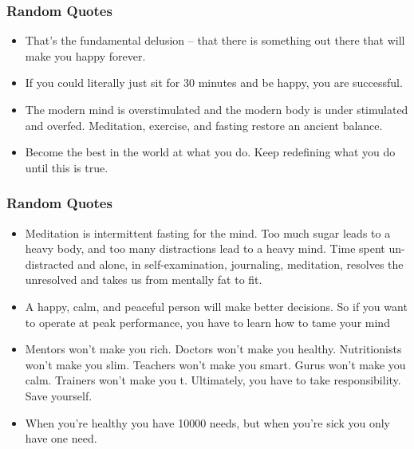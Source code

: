 \begin{frame}[fragile]\frametitle{ Random Quotes}

\begin{itemize}
\item That’s the fundamental delusion – that there is something out there
that will make you happy forever. 
\item If you could literally just sit for 30 minutes and be happy, you are
successful. 
\item The modern mind is overstimulated and the modern body is
under stimulated and overfed. Meditation, exercise, and fasting
restore an ancient balance.
\item Become the best in the world at what you do. Keep redefining what
you do until this is true.
\end{itemize}

\end{frame}

\begin{frame}[fragile]\frametitle{ Random Quotes}

\begin{itemize}
\item Meditation  is intermittent fasting for the mind. Too much sugar leads
to a heavy body, and too many distractions lead to a heavy mind.
Time spent un-distracted and alone, in self-examination, journaling,
meditation, resolves the unresolved and takes us from mentally fat to fit.

\item A happy, calm, and peaceful person will make better decisions. So if
you want to operate at peak performance, you have to learn how to
tame your mind

\item Mentors won’t make you rich. Doctors won’t make you healthy.
Nutritionists won’t make you slim. Teachers won’t make you smart. Gurus won’t make you calm. Trainers won’t make you  t. Ultimately,
you have to take responsibility. Save yourself.

\item When you’re healthy you have 10000 needs, but when you’re sick you
only have one need.
\end{itemize}

\end{frame}

